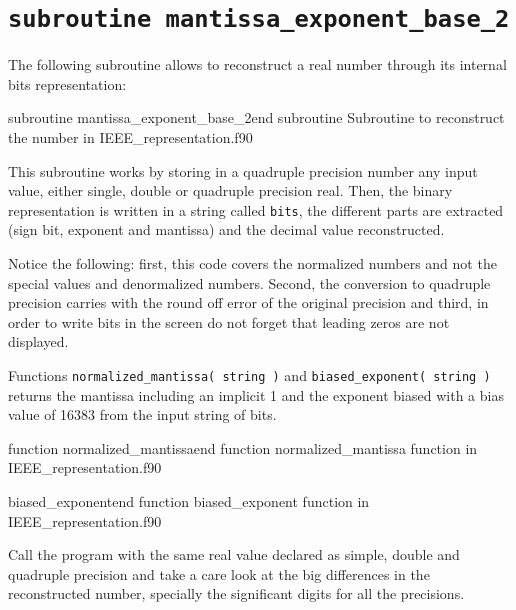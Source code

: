     \section{\texttt{subroutine mantissa\_exponent\_base\_2}} 


The following subroutine allows to reconstruct a real number through its internal bits representation: 

\newpage
{}
{subroutine mantissa_exponent_base_2}{end subroutine}
{Subroutine to reconstruct the number in IEEE_representation.f90} 


This subroutine works by storing in a quadruple precision number any input value, 
either single, double or quadruple precision real. Then,  
the binary representation is written in a string called \texttt{bits}, 
the different parts are extracted (sign bit, exponent and mantissa) 
and the decimal value reconstructed. 

Notice the following: 
first, this code covers the normalized numbers and not the special values and denormalized numbers. 
Second, the conversion to quadruple precision carries with the round off error of the original precision and 
third, in order to write bits in the screen do not forget that leading zeros are not displayed.

Functions \texttt{normalized\_mantissa( string )} and \texttt{biased\_exponent( string )} returns the mantissa including an implicit 1 and the exponent biased with a bias value of 16383 from the input string of bits. 

{function normalized_mantissa}{end function}
{normalized_mantissa function in IEEE_representation.f90} 

{biased_exponent}{end function}
{biased_exponent function in IEEE_representation.f90} 

Call the program with the same real value declared as simple, double and quadruple precision and take a care look at the big differences in the reconstructed number, specially the significant digits for all the precisions. 







 






































